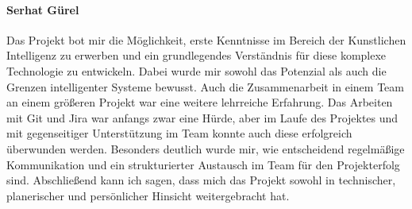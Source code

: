 \paragraph{Serhat Gürel}
Das Projekt bot mir die Möglichkeit, erste Kenntnisse im Bereich der Kunstlichen Intelligenz zu erwerben und ein grundlegendes Verständnis für diese komplexe Technologie zu entwickeln. Dabei wurde mir sowohl das Potenzial als auch die Grenzen intelligenter Systeme bewusst. Auch die Zusammenarbeit in einem Team an einem größeren Projekt war eine weitere lehrreiche Erfahrung. Das Arbeiten mit Git und Jira war anfangs zwar eine Hürde, aber im Laufe des Projektes und mit gegenseitiger Unterstützung im Team konnte auch diese erfolgreich überwunden werden. Besonders deutlich wurde mir, wie entscheidend regelmäßige Kommunikation und ein strukturierter Austausch im Team für den Projekterfolg sind. Abschließend kann ich sagen, dass mich das Projekt sowohl in technischer, planerischer und persönlicher Hinsicht weitergebracht hat.
